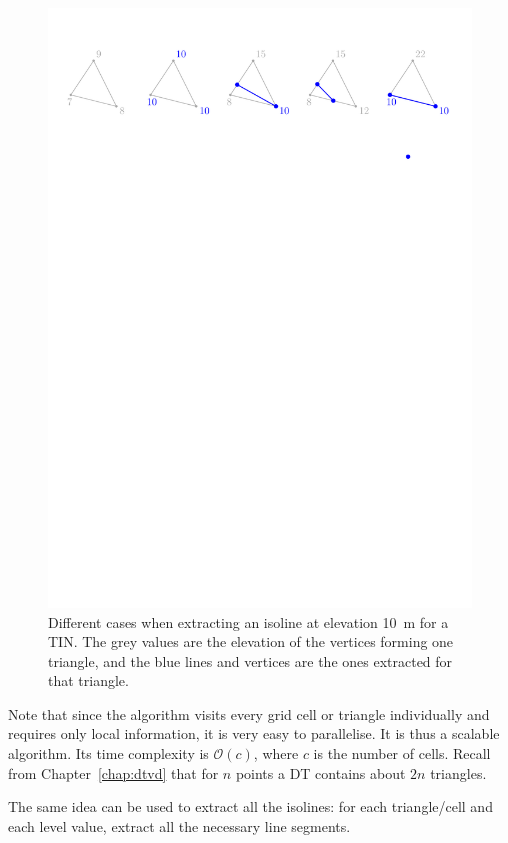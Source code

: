 \begin{figure}
  \centering
  \includegraphics[width=0.95\linewidth]{figs/isoline-tr}
\caption{Different cases when extracting an isoline at elevation \qty{10}{\m} for a TIN\@. The grey values are the elevation of the vertices forming one triangle, and the blue lines and vertices are the ones extracted for that triangle.}%
\label{fig:isoline-tr}
\end{figure}
Note that since the algorithm visits every grid cell or triangle individually and requires only local information, it is very easy to parallelise. 
It is thus a scalable algorithm.
Its time complexity is $\mathcal{O}(c)$, where $c$ is the number of cells.
Recall from Chapter~\ref{chap:dtvd} that for $n$ points a DT contains about $2n$ triangles.

The same idea can be used to extract all the isolines: for each triangle/cell and each level value, extract all the necessary line segments.


